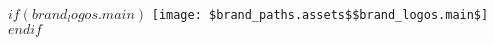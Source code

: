 
$if(brand_logos.main)$
\begingroup
\centering
\vspace*{2cm}
\texttt{[image: \$brand\_paths.assets\$\$brand\_logos.main\$]}
\vspace*{2cm}
\endgroup
$endif$